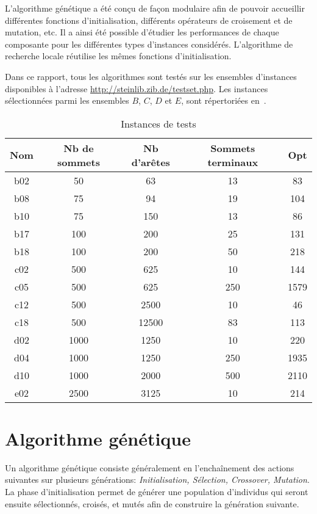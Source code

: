\documentclass[10pt]{article}
\begin{document}
	L'algorithme génétique a été conçu de façon modulaire afin de pouvoir accueillir différentes fonctions d'initialisation, différents opérateurs de croisement et de mutation, etc. Il a ainsi été possible d'étudier les performances de chaque composante pour les différentes types d'instances considérés. L'algorithme de recherche locale réutilise les mêmes fonctions d'initialisation.
	
	Dans ce rapport, tous les algorithmes sont testés sur les ensembles d'instances disponibles à l'adresse \url{http://steinlib.zib.de/testset.php}. Les instances sélectionnées parmi les ensembles $B$, $C$, $D$ et $E$, sont répertoriées en~.
	
	\begin{table}[h!]
		\centering
		\begin{tabular}{|c|c|c|c|c|}
			\hline
			\textbf{Nom} & \textbf{Nb de sommets} & \textbf{Nb d'arêtes} & \textbf{Sommets terminaux} & \textbf{Opt} \\
			\hline
			b02 & 50 & 63 & 13 & 83 \\
			b08	& 75 & 94 &	19 & 104 \\
			b10	& 75 & 150 & 13 & 86 \\
			b17	& 100 &	200 & 25 & 131 \\
			b18	& 100 & 200 & 50 & 218 \\
			c02	& 500 & 625 & 10 & 144 \\
			c05	& 500 & 625 & 250 & 1579 \\
			c12	& 500 & 2500 & 10 & 46 \\
			c18 & 500 & 12500 & 83 & 113 \\
			d02	& 1000 & 1250 & 10 & 220 \\
			d04	& 1000 & 1250 & 250 & 1935 \\
			d10	& 1000 & 2000 &	500 & 2110 \\
			e02	& 2500 & 3125 & 10 & 214 \\
			\hline
		\end{tabular}
		\caption{Instances de tests}
		\label{tab-instances}
	\end{table}
	
\section{Algorithme génétique}
	Un algorithme génétique consiste généralement en l'enchaînement des actions suivantes sur plusieurs générations: \textit{Initialisation, Sélection, Crossover, Mutation}. La phase d'initialisation permet de générer une population d'individus qui seront ensuite sélectionnés, croisés, et mutés afin de construire la génération suivante.
\end{document}

